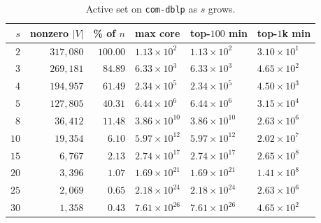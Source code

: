 \begin{table}[t]
\centering
\caption{Active set on \texttt{com-dblp} as $s$ grows.}
\label{tab:cs1}
\tiny
\setlength{\tabcolsep}{4pt}
\begin{tabular}{r r r l l l}
\toprule
$s$ & nonzero $|V|$ & \% of $n$ & max core & top-$100$ min & top-$1$k min \\
\midrule
$2$  & $317{,}080$ & $100.00$ & $1.13\!\times\!10^{2}$  & $1.13\!\times\!10^{2}$  & $3.10\!\times\!10^{1}$  \\
$3$  & $269{,}181$ & $84.89$  & $6.33\!\times\!10^{3}$  & $6.33\!\times\!10^{3}$  & $4.65\!\times\!10^{2}$  \\
$4$  & $194{,}957$ & $61.49$  & $2.34\!\times\!10^{5}$  & $2.34\!\times\!10^{5}$  & $4.50\!\times\!10^{3}$  \\
$5$  & $127{,}805$ & $40.31$  & $6.44\!\times\!10^{6}$  & $6.44\!\times\!10^{6}$  & $3.15\!\times\!10^{4}$  \\
$8$  & $36{,}412$  & $11.48$  & $3.86\!\times\!10^{10}$ & $3.86\!\times\!10^{10}$ & $2.63\!\times\!10^{6}$  \\
$10$ & $19{,}354$  & $6.10$   & $5.97\!\times\!10^{12}$ & $5.97\!\times\!10^{12}$ & $2.02\!\times\!10^{7}$  \\
$15$ & $6{,}767$   & $2.13$   & $2.74\!\times\!10^{17}$ & $2.74\!\times\!10^{17}$ & $2.65\!\times\!10^{8}$  \\
$20$ & $3{,}396$   & $1.07$   & $1.69\!\times\!10^{21}$ & $1.69\!\times\!10^{21}$ & $1.41\!\times\!10^{8}$  \\
$25$ & $2{,}069$   & $0.65$   & $2.18\!\times\!10^{24}$ & $2.18\!\times\!10^{24}$ & $2.63\!\times\!10^{6}$  \\
$30$ & $1{,}358$   & $0.43$   & $7.61\!\times\!10^{26}$ & $7.61\!\times\!10^{26}$ & $4.65\!\times\!10^{2}$  \\
\bottomrule
\end{tabular}
\end{table}

